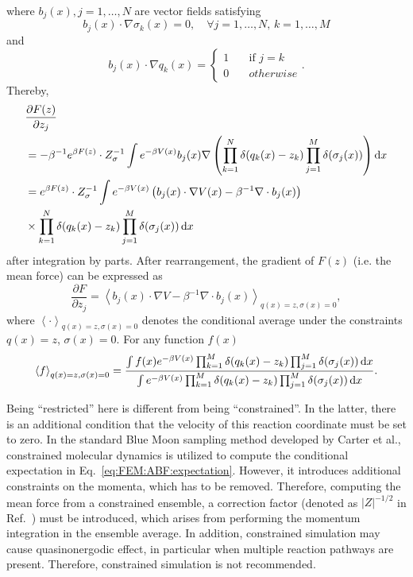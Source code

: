 where $b_j(x), j=1,\dots,N$ are vector fields satisfying
\begin{equation}
	b_j(x)\cdot \nabla \sigma_k(x)=0,\quad \forall j=1,\dots,N,\, k=1,\dots,M
\end{equation}
and
\begin{equation}
	b_j(x)\cdot \nabla q_k(x)=\begin{cases}
		1\quad &\text{if } j=k\\
		0\quad &otherwise
	\end{cases}.
\end{equation}
Thereby,
\begin{align}
    &\frac{\partial F(z)}{\partial z_j}\notag\\
    &=-\beta^{-1}e^{\beta F(z)}\cdot Z_\sigma^{-1} \int e^{-\beta V(x)}b_j(x)\nabla\left(\prod_{k=1}^{N}\delta(q_k(x)-z_k)\prod_{j=1}^M\delta(\sigma_j(x))\right)\mathop{}\!\mathrm{d} x\notag\\
    &=e^{\beta F(z)}\cdot Z_\sigma^{-1} \int e^{-\beta V(x)} \left(b_j(x)\cdot \nabla V(x)-\beta^{-1}\nabla\cdot b_j(x)\right)\notag\\
    &\times \prod_{k=1}^{N}\delta(q_k(x)-z_k)\prod_{j=1}^M\delta(\sigma_j(x))\mathop{}\!\mathrm{d} x
\end{align}
after integration by parts. After rearrangement, the gradient of $F(z)$ (i.e. the mean force) can be expressed as
\begin{equation}
	\frac{\partial F}{\partial z_j}=\left< b_j(x)\cdot \nabla V-\beta^{-1}\nabla\cdot b_j(x)\right>_{q(x)=z,\sigma(x)=0},
	\label{eq:FEM:ABF:meanforce}
\end{equation}
where $\left<\cdot\right>_{q(x)=z,\sigma(x)=0}$ denotes the conditional average under the constraints $q(x)=z$, $\sigma(x)=0$. For any function $f(x)$
\begin{equation}
	\left<f\right>_{q(x)=z,\sigma(x)=0}=\frac{\int f(x)e^{-\beta V(x)}\prod_{k=1}^{M}\delta(q_k(x)-z_k)\prod_{j=1}^M\delta(\sigma_j(x))\mathop{}\!\mathrm{d} x}{\int e^{-\beta V(x)}\prod_{k=1}^{M}\delta(q_k(x)-z_k)\prod_{j=1}^M\delta(\sigma_j(x))\mathop{}\!\mathrm{d} x}.
	\label{eq:FEM:ABF:expectation}
\end{equation}

Being ``restricted'' here is different from being ``constrained''. In the latter, there is an additional condition that the velocity of this reaction coordinate must be set to zero. In the standard Blue Moon sampling method developed by Carter et al.\cite{CarterCPL1989}, constrained molecular dynamics is utilized to compute the conditional expectation in Eq.~\ref{eq:FEM:ABF:expectation}. However, it introduces additional constraints on the momenta, which has to be removed. Therefore, computing the mean force from a constrained ensemble, a correction factor (denoted as $|Z|^{-1/2}$ in Ref.~\cite{CarterCPL1989}) must be introduced, which arises from performing the momentum integration in the ensemble average. In addition, constrained simulation may cause quasinonergodic effect, in particular when multiple reaction pathways are present. Therefore, constrained simulation is not recommended.

